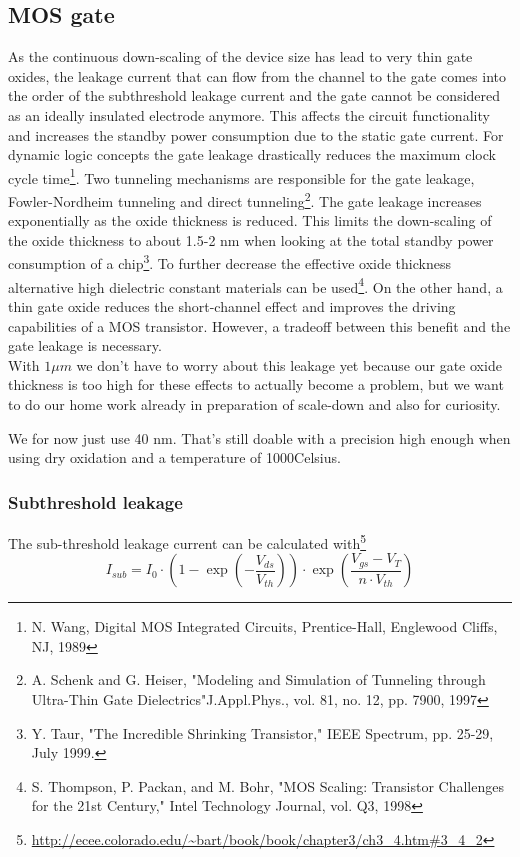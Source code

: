 \subsection{MOS gate}
As the continuous down-scaling of the device size has lead to very thin gate oxides, the leakage current that can flow from the channel to the gate comes into the order of the subthreshold leakage current and the gate cannot be considered as an ideally insulated electrode anymore.
This affects the circuit functionality and increases the standby power consumption due to the static gate current.
For dynamic logic concepts the gate leakage drastically reduces the maximum clock cycle time\footnote{N. Wang, Digital MOS Integrated Circuits, Prentice-Hall, Englewood Cliffs, NJ, 1989}.
Two tunneling mechanisms are responsible for the gate leakage, Fowler-Nordheim tunneling and direct tunneling\footnote{A. Schenk and G. Heiser, "Modeling and Simulation of Tunneling through Ultra-Thin Gate Dielectrics"J.Appl.Phys., vol. 81, no. 12, pp. 7900, 1997}.
The gate leakage increases exponentially as the oxide thickness is reduced.
This limits the down-scaling of the oxide thickness to about 1.5-2 nm when looking at the total standby power consumption of a chip\footnote{Y. Taur, "The Incredible Shrinking Transistor," IEEE Spectrum, pp. 25-29, July 1999.}.
To further decrease the effective oxide thickness alternative high dielectric constant materials can be used\footnote{S. Thompson, P. Packan, and M. Bohr, "MOS Scaling: Transistor Challenges for the 21st Century," Intel Technology Journal, vol. Q3, 1998}.
On the other hand, a thin gate oxide reduces the short-channel effect and improves the driving capabilities of a MOS transistor.
However, a tradeoff between this benefit and the gate leakage is necessary.\\

With $1 \mu m$ we don't have to worry about this leakage yet because our gate oxide thickness is too high for these effects to actually become a problem, but we want to do our home work already in preparation of scale-down and also for curiosity.

We for now just use 40 nm. That's still doable with a precision high enough when using dry oxidation and a temperature of 1000\degree Celsius.

\subsubsection{Subthreshold leakage}

The sub-threshold leakage current can be calculated with\footnote{\url{http://ecee.colorado.edu/\~bart/book/book/chapter3/ch3_4.htm\#3_4_2}}
\begin{equation}
I_{sub}
=
I_0
\cdot
\left(1-\exp\left(-\frac{V_{ds}}{V_{th}}\right)\right)
\cdot
\exp\left(\frac{V_{gs}-V_{T}}{n \cdot V_{th}}\right)
\end{equation}


